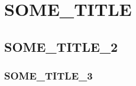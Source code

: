 \documentclass[main.tex]{subfiles}
\begin{document}
\chapter{SOME_TITLE}
\vspace*{-1\baselineskip}

\section{SOME_TITLE_2}

\subsection{SOME_TITLE_3}




\OnlyInSubfile{\printglobalbibliography}
\end{document}
